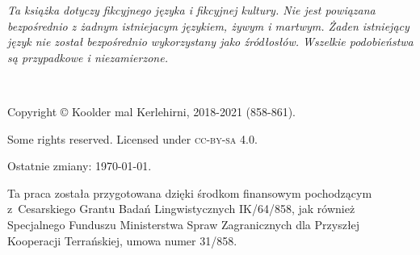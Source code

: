 \emph{Ta książka dotyczy fikcyjnego języka i fikcyjnej kultury. Nie jest
powiązana bezpośrednio z żadnym istniejacym językiem, żywym i martwym. Żaden
istniejący język nie został bezpośrednio wykorzystany jako źródłosłów. Wszelkie
podobieństwa są przypadkowe i niezamierzone.}

~\vfill

\begingroup
\setlength\parindent{0pt}\footnotesize
Copyright © Koolder mal Kerlehirni, 2018-2021 (858-861).

\bigskip

Some rights reserved. Licensed under \textsc{cc-by-sa} 4.0.

Ostatnie zmiany: \today{}.

\medskip

Ta praca została przygotowana dzięki środkom finansowym
pochodzącym z~Cesarskiego Grantu Badań Lingwistycznych IK/64/858,
jak również Specjalnego Funduszu Ministerstwa Spraw Zagranicznych dla
Przyszłej Kooperacji Terrańskiej, umowa numer 31/858.

\endgroup